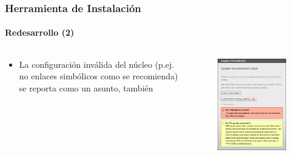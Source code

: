
\begin{frame}[fragile]
	\frametitle{Herramienta de Instalación}
	\framesubtitle{Redesarrollo (2)}

	\begin{columns}[T]

		\begin{column}{.5\textwidth}
			\begin{itemize}
				\item La configuración inválida del núcleo (p.ej. no enlaces simbólicos como se recomienda) se reporta como un asunto, también
			\end{itemize}
		\end{column}

		\begin{column}{.5\textwidth}
			\begin{figure}\vspace*{-0.4cm}
				\includegraphics[width=0.8\linewidth]{Images/InstallTool/SystemEnvironmentCheck.png}
			\end{figure}
		\end{column}

	\end{columns}

\end{frame}

